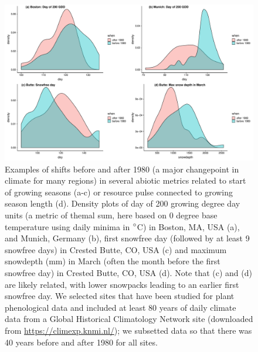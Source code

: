 \documentclass[11pt,letterpaper]{article}
\begin{document}
\clearpage

\begin{figure}[t!]
\centering
\includegraphics[width=1\textwidth]{..//..//R/graphs/otherdat/climdata.pdf}
\caption{Examples of shifts before and after 1980 (a major changepoint in climate for many regions) in several abiotic metrics related to start of growing seasons (a-c) or resource pulse connected to growing season length (d). Density plots of day of 200 growing degree day units (a metric of themal sum, here based on 0 degree base temperature using daily minima in $\degree$C) in Boston, MA, USA (a), and Munich, Germany (b), first snowfree day (followed by at least 9 snowfree days) in Crested Butte, CO, USA (c) and maximum snowdepth (mm) in March (often the month before the first snowfree day) in Crested Butte, CO, USA (d). Note that (c) and (d) are likely related, with lower snowpacks leading to an earlier first snowfree day. We selected sites that have been studied for plant phenological data and included at least 80 years of daily climate data from a Global Historical Climatology Network site (downloaded from \url{https://climexp.knmi.nl/}); we subsetted data so that there was 40 years before and after 1980 for all sites.}
 \label{fig:climdat}
\end{figure}
\end{document}
